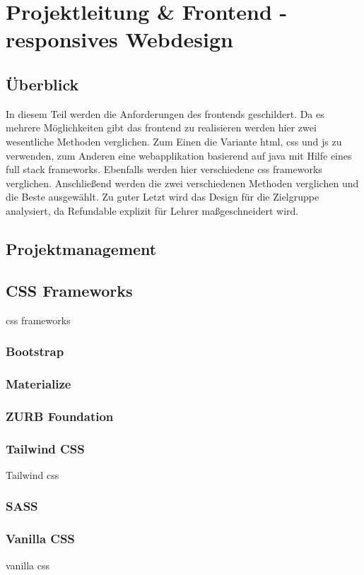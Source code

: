 \section{Projektleitung \& Frontend - responsives Webdesign}
	\subsection{Überblick}
	In diesem Teil werden die Anforderungen des \Gls{frontend}s geschildert. Da es mehrere Möglichkeiten gibt das \Gls{frontend} zu realisieren werden hier zwei wesentliche Methoden verglichen. Zum Einen die Variante \Gls{html}, \Gls{css} und \Gls{js} zu verwenden, zum Anderen eine \Gls{webapplikation} basierend auf \Gls{java} mit Hilfe eines \Gls{full stack framework}s. Ebenfalls werden hier verschiedene \Gls{css} \Gls{framework}s verglichen. Anschließend werden die zwei verschiedenen Methoden verglichen und die Beste ausgewählt. Zu guter Letzt wird das Design für die Zielgruppe analysiert, da Refundable explizit für Lehrer maßgeschneidert wird.
	\subsection{Projektmanagement}
	\subsection{CSS Frameworks}
	\Gls{css} \Gls{framework}s
		\subsubsection{Bootstrap}
		\subsubsection{Materialize}
		\subsubsection{ZURB Foundation}
		\subsubsection{Tailwind CSS}
		Tailwind \Gls{css}
		\subsubsection{SASS}
		\subsubsection{Vanilla CSS}
		\Gls{vanilla} \Gls{css}
